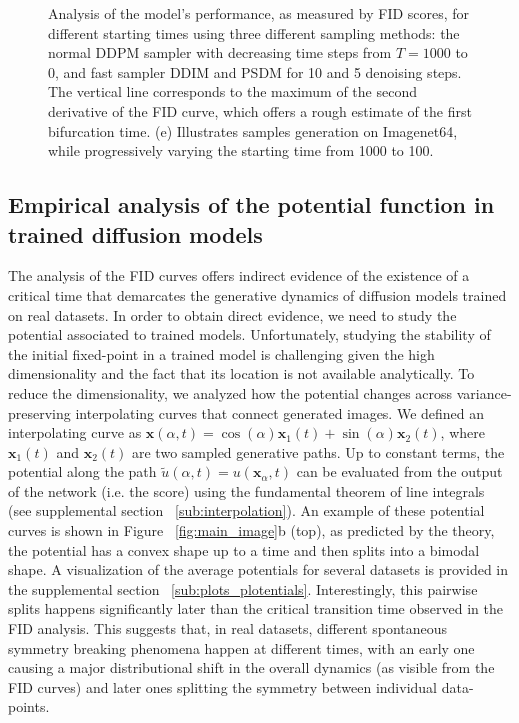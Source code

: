 \documentclass{article}
\newcommand{\vect}[1]{\boldsymbol{#1}}
\begin{document}
\begin{figure}[ht!]
\begin{minipage}[b]{.298\textwidth}
\end{minipage}%
\caption{Analysis of the model's performance, as measured by FID scores, for different starting times using three different sampling methods: the normal DDPM sampler with decreasing time steps from $T=1000$ to 0, and fast sampler DDIM and PSDM for 10 and 5 denoising steps. The vertical line corresponds to the maximum of the second derivative of the FID curve, which offers a rough estimate of the first bifurcation time. (e) Illustrates samples generation on Imagenet64, while progressively varying the starting time from 1000 to 100.}
\label{fig:late_start_analysis}
\end{figure}


\subsection{Empirical analysis of the potential function in trained diffusion models}

The analysis of the FID curves offers indirect evidence of the existence of a critical time that demarcates the generative dynamics of diffusion models trained on real datasets. In order to obtain direct evidence, we need to study the potential associated to trained models. Unfortunately, studying the stability of the initial fixed-point in a trained model is challenging given the high dimensionality and the fact that its location is not available analytically. To reduce the dimensionality, we analyzed how the potential changes across variance-preserving interpolating curves that connect generated images. We defined an interpolating curve as $\vect{x}(\alpha, t) = \cos(\alpha) \vect{x}_1(t) + \sin (\alpha) \vect{x}_2(t)$, where $\vect{x}_1(t)$ and $\vect{x}_2(t)$ are two sampled generative paths. Up to constant terms, the potential along the path $\tilde{u}(\alpha, t) = u(\vect{x}_\alpha, t)$ can be evaluated from the output of the network (i.e. the score) using the fundamental theorem of line integrals (see supplemental section ~\ref{sub:interpolation}). An example of these potential curves is shown in Figure ~\ref{fig:main_image}b (top), as predicted by the theory, the potential has a convex shape up to a time and then splits into a bimodal shape. A visualization of the average potentials for several datasets is provided in the supplemental section ~\ref{sub:plots_plotentials}. Interestingly, this pairwise splits happens significantly later than the critical transition time observed in the FID analysis. This suggests that, in real datasets, different spontaneous symmetry breaking phenomena happen at different times, with an early one causing a major distributional shift in the overall dynamics (as visible from the FID curves) and later ones splitting the symmetry between individual data-points.
\end{document}

